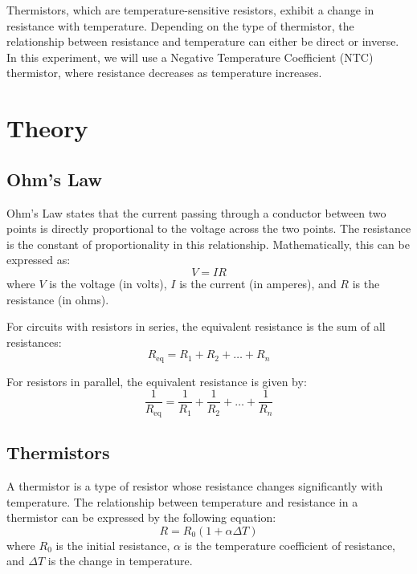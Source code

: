 \documentclass[journal]{IEEEtran}
\begin{document}
Thermistors, which are temperature-sensitive resistors, exhibit a change in resistance with temperature. Depending on the type of thermistor, the relationship between resistance and temperature can either be direct or inverse. In this experiment, we will use a Negative Temperature Coefficient (NTC) thermistor, where resistance decreases as temperature increases.

\section{Theory}
\subsection{Ohm's Law}
Ohm’s Law states that the current passing through a conductor between two points is directly proportional to the voltage across the two points. The resistance is the constant of proportionality in this relationship. Mathematically, this can be expressed as:
\begin{equation}
    V = IR
\end{equation}
where \( V \) is the voltage (in volts), \( I \) is the current (in amperes), and \( R \) is the resistance (in ohms).

For circuits with resistors in series, the equivalent resistance is the sum of all resistances:
\begin{equation}
    R_{\text{eq}} = R_1 + R_2 + \dots + R_n
    \label{eq:series}
\end{equation}

For resistors in parallel, the equivalent resistance is given by:
\begin{equation}
    \frac{1}{R_{\text{eq}}} = \frac{1}{R_1} + \frac{1}{R_2} + \dots + \frac{1}{R_n}
    \label{eq:parallel}
\end{equation}

\subsection{Thermistors}
A thermistor is a type of resistor whose resistance changes significantly with temperature. The relationship between temperature and resistance in a thermistor can be expressed by the following equation:
\begin{equation}
    R = R_0 (1 + \alpha \Delta T)
\end{equation}
where \( R_0 \) is the initial resistance, \( \alpha \) is the temperature coefficient of resistance, and \( \Delta T \) is the change in temperature.
\end{document}

